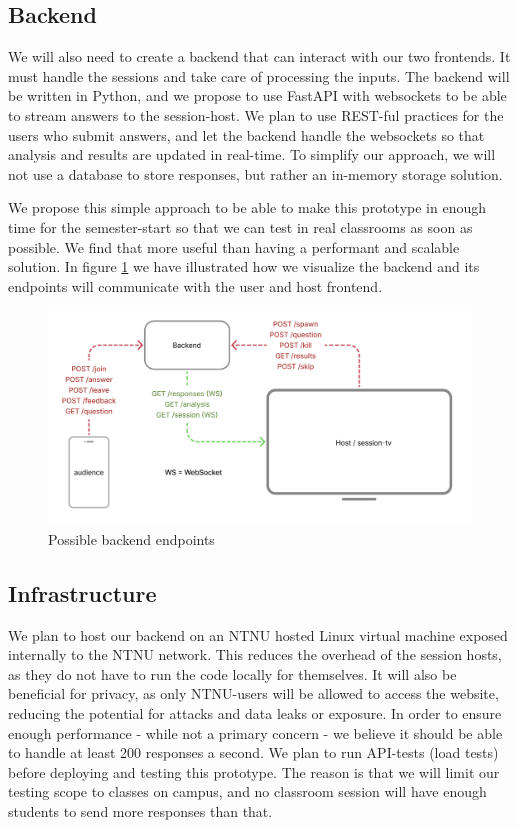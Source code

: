 \subsection{Backend}
We will also need to create a backend that can interact with our two frontends. It must handle the sessions and take care of processing the inputs. The backend will be written in Python, and we propose to use FastAPI with websockets to be able to stream answers to the session-host. We plan to use REST-ful practices for the users who submit answers, and let the backend handle the websockets so that analysis and results are updated in real-time. To simplify our approach, we will not use a database to store responses, but rather an in-memory storage solution.

We propose this simple approach to be able to make this prototype in enough time for the semester-start so that we can test in real classrooms as soon as possible. We find that more useful than having a performant and scalable solution. In figure \ref{fig:backend-endpoint-illustration} we have illustrated how we visualize the backend and its endpoints will communicate with the user and host frontend.

\begin{figure}[h!]
    \centering
    \includegraphics[width=1\linewidth]{figures//c5/backend.png}
    \caption{Possible backend endpoints}
    \label{fig:backend-endpoint-illustration}
\end{figure}

\subsection{Infrastructure}
We plan to host our backend on an NTNU hosted Linux virtual machine exposed internally to the NTNU network. This reduces the overhead of the session hosts, as they do not have to run the code locally for themselves. It will also be beneficial for privacy, as only NTNU-users will be allowed to access the website, reducing the potential for attacks and data leaks or exposure. In order to ensure enough performance - while not a primary concern - we believe it should be able to handle at least 200 responses a second. We plan to run API-tests (load tests) before deploying and testing this prototype. The reason is that we will limit our testing scope to classes on campus, and no classroom session will have enough students to send more responses than that.



